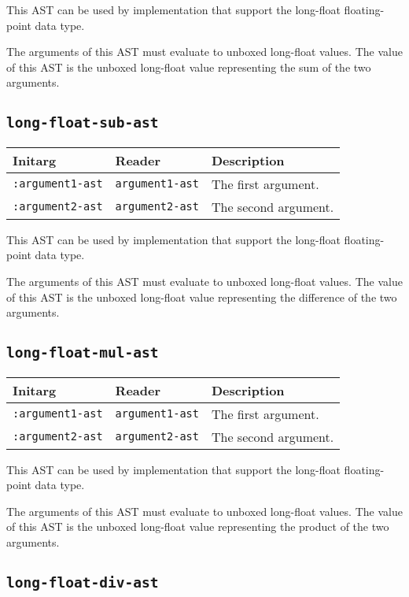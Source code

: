 This AST can be used by implementation that support the long-float
floating-point data type.  

The arguments of this AST must evaluate to unboxed long-float
values.  The value of this AST is the unboxed long-float value
representing the sum of the two arguments.

\subsection{\texttt{long-float-sub-ast}}
\label{sec-ast-long-float-sub}

\begin{tabular}{|l|l|l|}
\hline
Initarg & Reader & Description\\
\hline\hline
\texttt{:argument1-ast} & \texttt{argument1-ast} & The first argument.\\
\hline
\texttt{:argument2-ast} & \texttt{argument2-ast} & The second argument.\\
\hline
\end{tabular}

This AST can be used by implementation that support the long-float
floating-point data type.  

The arguments of this AST must evaluate to unboxed long-float
values.  The value of this AST is the unboxed long-float value
representing the difference of the two arguments.

\subsection{\texttt{long-float-mul-ast}}
\label{sec-ast-long-float-mul}

\begin{tabular}{|l|l|l|}
\hline
Initarg & Reader & Description\\
\hline\hline
\texttt{:argument1-ast} & \texttt{argument1-ast} & The first argument.\\
\hline
\texttt{:argument2-ast} & \texttt{argument2-ast} & The second argument.\\
\hline
\end{tabular}

This AST can be used by implementation that support the long-float
floating-point data type.  

The arguments of this AST must evaluate to unboxed long-float
values.  The value of this AST is the unboxed long-float value
representing the product of the two arguments.

\subsection{\texttt{long-float-div-ast}}
\label{sec-ast-long-float-div}

